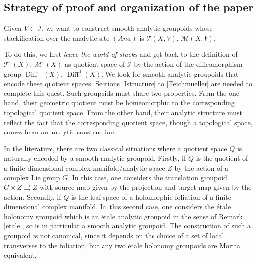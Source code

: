 \documentclass[10pt]{amsart}
\let\mathcal\mathscr
\newcommand{\Ana}{\mathit{Ana}}
\DeclareMathOperator{\Diff}{Diff}
\theoremstyle{plain}
\theoremstyle{definition}
\theoremstyle{remark}
\numberwithin{equation}{section}
\newcommand{\cI}{\mathcal{I}}
\begin{document}
\subsection{Strategy of proof and organization of the paper}
\label{strategy}
Given $V\subset \cI$, we want to construct smooth analytic groupoids whose stackification over the analytic site $(\Ana)$ is $\mathcal T(X,V)$, \resp $\mathcal M(X,V)$.

To do this, we first \emph{leave the world of stacks} and get back to the definition of $\mathcal T^s(X)$, \resp $\mathcal M^s(X)$ as quotient space of $\cI$ by the action of the diffeomorphism group $\Diff^+(X)$, \resp $\Diff^0(X)$. We look for smooth analytic groupoids that encode these quotient spaces. Sections \ref{Istructure} to \ref{Teichmueller} are needed to complete this quest. Such groupoids must share two properties. From the one hand, their geometric quotient must be homeomorphic to the corresponding topological quotient space. From the other hand, their analytic structure must reflect the fact that the corresponding quotient space, though a topological space, comes from an analytic construction.

In the literature, there are two classical situations where a quotient space $Q$ is naturally encoded by a smooth analytic groupoid. Firstly, if $Q$ is the quotient of a finite-dimensional complex manifold/analytic space $Z$ by the action of a complex Lie group $G$. In this case, one considers the translation groupoid $G\times Z\rightrightarrows Z$ with source map given by the projection and target map given by the action. Secondly, if $Q$ is the leaf space of a holomorphic foliation of a finite-dimensional complex manifold. In~this second case, one considers the étale holonomy groupoid which is an étale analytic groupoid in the sense of Remark \ref{etale}, so is in particular a smooth analytic groupoid. The construction of such a groupoid is not canonical, since it depends on the choice of a set of local transverses to the foliation, but any two étale holonomy groupoids are Morita equivalent, \cite[\S 5]{Moerdijk}.
\end{document}

